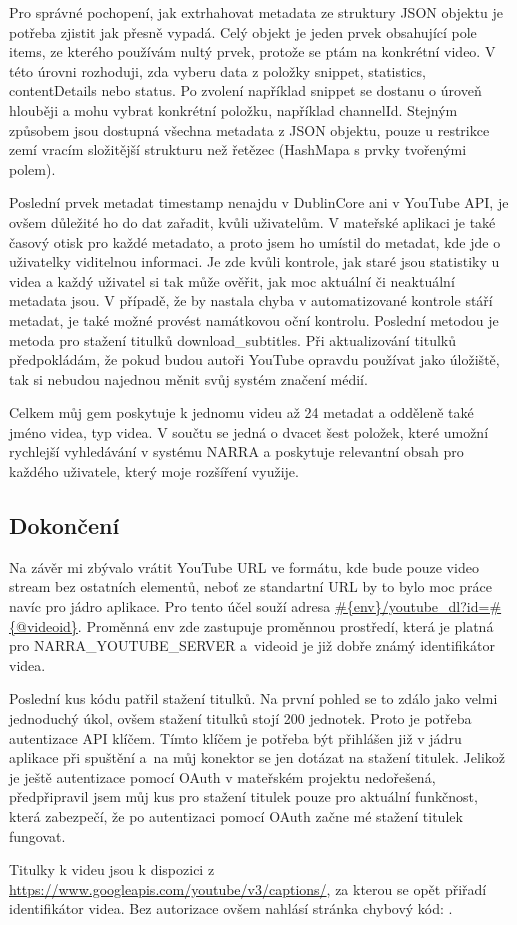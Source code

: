 \par Pro správné pochopení, jak extrhahovat metadata ze struktury JSON objektu je potřeba zjistit jak přesně vypadá. Celý objekt je jeden prvek obsahující pole items, ze kterého používám nultý prvek, protože se ptám na konkrétní video. V této úrovni rozhoduji, zda vyberu data z položky snippet, statistics, contentDetails nebo status. Po zvolení například snippet se dostanu o úroveň hlouběji a mohu vybrat konkrétní položku, například channelId. Stejným způsobem jsou dostupná všechna metadata z JSON objektu, pouze u restrikce zemí vracím složitější strukturu než řetězec (HashMapa s prvky tvořenými polem).
\par Poslední prvek metadat timestamp nenajdu v DublinCore ani v YouTube API, je ovšem důležité ho do dat zařadit, kvůli uživatelům. V mateřské aplikaci je také časový otisk pro každé metadato, a proto jsem ho umístil do metadat, kde jde o uživatelky viditelnou informaci. Je zde kvůli kontrole, jak staré jsou statistiky u videa a každý uživatel si tak může ověřit, jak moc aktuální či neaktuální metadata jsou. V případě, že by nastala chyba v automatizované kontrole stáří metadat, je také možné provést namátkovou oční kontrolu. Poslední metodou je metoda pro stažení titulků download\_subtitles. Při aktualizování titulků předpokládám, že pokud budou autoři YouTube opravdu používat jako úložiště, tak si nebudou najednou měnit svůj systém značení médií.
\par Celkem můj gem poskytuje k jednomu videu až 24 metadat a odděleně také jméno videa, typ videa. V součtu se jedná o dvacet šest položek, které umožní rychlejší vyhledávání v systému NARRA a poskytuje relevantní obsah pro každého uživatele, který moje rozšíření využije.

\subsection{Dokončení}
\par Na závěr mi zbývalo vrátit YouTube URL ve formátu, kde bude pouze video stream bez ostatních elementů, neboť ze standartní URL by to bylo moc práce navíc pro jádro aplikace. Pro tento účel souží adresa \url{#{env}/youtube_dl?id=#{@videoid}}. Proměnná env zde zastupuje proměnnou prostředí, která je platná pro NARRA\_YOUTUBE\_SERVER a~videoid je již dobře známý identifikátor videa.
\par Poslední kus kódu patřil stažení titulků. Na první pohled se to zdálo jako velmi jednoduchý úkol, ovšem stažení titulků stojí 200 jednotek. Proto je potřeba autentizace API klíčem. Tímto klíčem je potřeba být přihlášen již v jádru aplikace při spuštění a~na můj konektor se jen dotázat na stažení titulek. Jelikož je ještě autentizace pomocí OAuth v mateřském projektu nedořešená, předpřipravil jsem můj kus pro stažení titulek pouze pro aktuální funkčnost, která zabezpečí, že po autentizaci pomocí OAuth začne mé stažení titulek fungovat.
\par Titulky k videu jsou k dispozici z \url{https://www.googleapis.com/youtube/v3/captions/}, za kterou se opět přiřadí identifikátor videa. Bez autorizace ovšem nahlásí stránka chybový kód: .